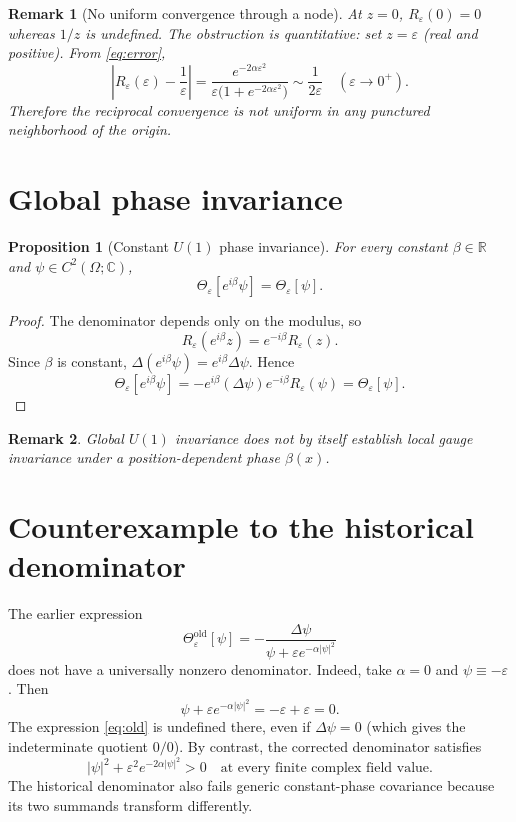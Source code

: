 \documentclass[11pt]{article}
\newtheorem{proposition}{Proposition}
\newtheorem{remark}{Remark}
\newcommand{\C}{\mathbb{C}}
\newcommand{\R}{\mathbb{R}}
\newcommand{\eps}{\varepsilon}
\newcommand{\Reps}{R_{\eps}}
\newcommand{\Thetaeps}{\Theta_{\eps}}
\begin{document}
\begin{remark}[No uniform convergence through a node]
At $z=0$, $\Reps(0)=0$ whereas $1/z$ is undefined. The obstruction
is quantitative: set $z=\eps$ (real and positive). From
\eqref{eq:error},
\[
\left|\Reps(\eps)-\frac1\eps\right|
=\frac{e^{-2\alpha\eps^2}}
{\eps\bigl(1+e^{-2\alpha\eps^2}\bigr)}
\sim\frac{1}{2\eps}\quad(\eps\to0^+).
\]
Therefore the reciprocal convergence is not uniform in any punctured
neighborhood of the origin.
\end{remark}

\section{Global phase invariance}

\begin{proposition}[Constant $U(1)$ phase invariance]
For every constant $\beta\in\R$ and
$\psi\in C^2(\Omega;\C)$,
\[
\Thetaeps[e^{i\beta}\psi]=\Thetaeps[\psi].
\]
\end{proposition}

\begin{proof}
The denominator depends only on the modulus, so
\[
\Reps(e^{i\beta}z)=e^{-i\beta}\Reps(z).
\]
Since $\beta$ is constant,
$\Delta(e^{i\beta}\psi)=e^{i\beta}\Delta\psi$. Hence
\[
\Thetaeps[e^{i\beta}\psi]
=-e^{i\beta}(\Delta\psi)e^{-i\beta}\Reps(\psi)
=\Thetaeps[\psi].
\]
\end{proof}

\begin{remark}
Global $U(1)$ invariance does not by itself establish local gauge
invariance under a position-dependent phase $\beta(x)$.
\end{remark}

\section{Counterexample to the historical denominator}

The earlier expression
\begin{equation}\label{eq:old}
\Thetaeps^{\mathrm{old}}[\psi]
=-\frac{\Delta\psi}
{\psi+\eps e^{-\alpha|\psi|^2}}
\end{equation}
does not have a universally nonzero denominator. Indeed, take
$\alpha=0$ and $\psi\equiv-\eps$. Then
\[
\psi+\eps e^{-\alpha|\psi|^2}
=-\eps+\eps=0.
\]
The expression \eqref{eq:old} is undefined there, even if
$\Delta\psi=0$ (which gives the indeterminate quotient $0/0$).
By contrast, the corrected denominator satisfies
\[
|\psi|^2+\eps^2e^{-2\alpha|\psi|^2}>0
\quad\text{at every finite complex field value.}
\]
The historical denominator also fails generic constant-phase
covariance because its two summands transform differently.
\end{document}
